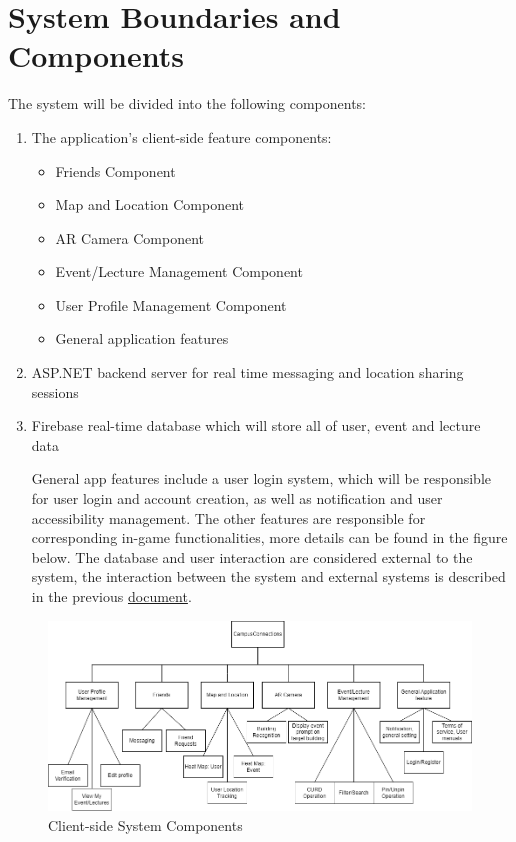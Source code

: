 \documentclass{article}
\begin{document}
\section{System Boundaries and Components}
The system will be divided into the following components:
\begin{enumerate}
	\item The application's client-side feature components:
	      \begin{itemize}
		      \item Friends Component
		      \item Map and Location Component
		      \item AR Camera Component
		      \item Event/Lecture Management Component
		      \item User Profile Management Component
		      \item General application features
	      \end{itemize}
	\item ASP.NET backend server for real time messaging and location sharing sessions
	\item Firebase real-time database which will store all of user, event and lecture data
	
\quad General app features include a user login system, which will be responsible for user login and account creation, as well as notification and user accessibility management. The other features are responsible for corresponding in-game functionalities, more details can be found in the figure below. The database and user interaction are considered external to the system, the interaction between the system and external systems is described in the previous \href{https://github.com/beatlepie/4G06CapstoneProjectTeam2/blob/docs-hazard-analysis/docs/SRS-Volere/SRS.pdf}{document}.
\end{enumerate}
\begin{figure}[H]
\begin{center}
\includegraphics[scale=0.4]{components.png}
\end{center}
\caption{Client-side System Components}
\end{figure}
\end{document}
